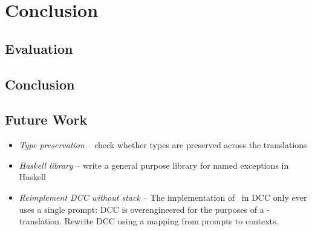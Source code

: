 \chapter{Conclusion}

\section{Evaluation}
\section{Conclusion}

\section{Future Work}
\begin{itemize}
  \item \emph{Type preservation} -- check whether types are preserved across the translations
  \item \emph{Haskell library} -- write a general purpose library for named exceptions in Haskell
  \item \emph{Reimplement DCC without stack} -- The implementation of \lmu\ in DCC only ever uses a single prompt: DCC is overengineered for the purposes of a \lmu-translation. Rewrite DCC using a mapping from prompts to contexts.
\end{itemize}
